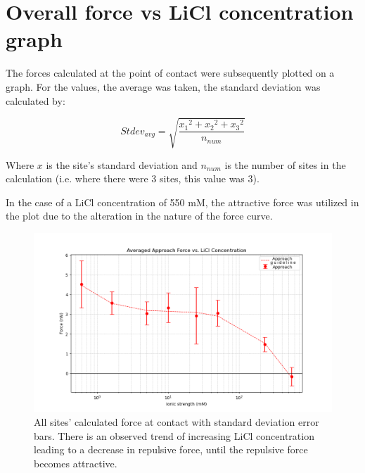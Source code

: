 
\section{Overall force vs LiCl concentration graph}

The forces calculated at the point of contact were subsequently plotted on a graph. For the values, the average was taken, the standard deviation was calculated by:

\begin{equation}
Stdev_{avg} = \sqrt{\frac{{x_1}^2 + {x_2}^2 + {x_3}^2}{n_{num}}}  
\label{eq:Stdevavg}
\end{equation}

Where $x$ is the site's standard deviation and $n_{num}$ is the number of sites in the calculation (i.e. where there were 3 sites, this value was 3).

 In the case of a LiCl concentration of 550 mM, the attractive force was utilized in the plot due to the alteration in the nature of the force curve.

\begin{figure}
    \centering
    \includegraphics[width=1\linewidth]{chapter5/Average Approach.png}
    \caption{All sites' calculated force at contact with standard deviation error bars. There is an observed trend of increasing LiCl concentration leading to a decrease in repulsive force, until the repulsive force becomes attractive.}
    \label{fig:site1cont}
\end{figure}


